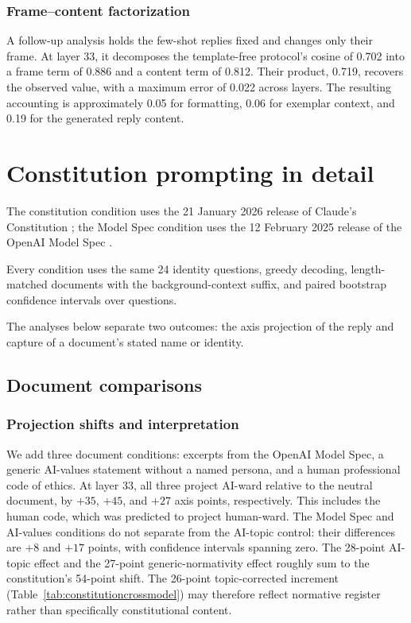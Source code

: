 \subsubsection{Frame--content factorization}

A follow-up analysis holds the few-shot replies fixed and changes only their
frame. At layer 33, it decomposes the template-free protocol's cosine of 0.702
into a frame term of 0.886 and a content term of 0.812. Their product, 0.719,
recovers the observed value, with a maximum error of 0.022 across layers. The
resulting accounting is approximately 0.05 for formatting, 0.06 for exemplar
context, and 0.19 for the generated reply content.

\section{Constitution prompting in detail}
\label{app:constitutions}

The constitution condition uses the 21 January 2026 release of
Claude's Constitution \citep{claude2026constitution}; the Model Spec condition
uses the 12 February 2025 release of the OpenAI Model Spec
\citep{openai2025modelspec}.

Every condition uses the same 24 identity questions, greedy decoding,
length-matched documents with the background-context suffix, and paired
bootstrap confidence intervals over questions.

The analyses below separate two outcomes: the axis projection of the reply and
capture of a document's stated name or identity.

\subsection{Document comparisons}

\subsubsection{Projection shifts and interpretation}

We add three document conditions: excerpts from the OpenAI Model Spec, a
generic AI-values statement without a named persona, and a human professional
code of ethics. At layer 33, all three project AI-ward relative to the neutral
document, by $+35$, $+45$, and $+27$ axis points, respectively. This includes
the human code, which was predicted to project human-ward. The Model Spec and
AI-values conditions do not separate from the AI-topic control: their
differences are $+8$ and $+17$ points, with confidence intervals spanning zero.
The 28-point AI-topic effect and the 27-point generic-normativity effect roughly
sum to the constitution's 54-point shift. The 26-point topic-corrected
increment (Table~\ref{tab:constitutioncrossmodel}) may therefore reflect
normative register rather than
specifically constitutional content.

